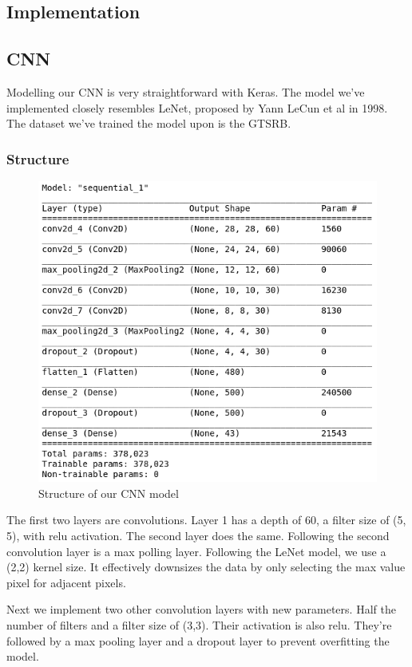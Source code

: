 \documentclass[12pt, landscape, margin=2cm]{article}
\begin{document}
\begin{multicols}{3}
\section{Implementation}

\subsection{CNN}
Modelling our CNN is very straightforward with Keras. The model we've
implemented closely resembles LeNet, proposed by Yann LeCun et al in 1998. The
dataset we've trained the model upon is the GTSRB.

\subsubsection{Structure}
\begin{figure}[H]
    \centerline{\includegraphics[scale = 0.5]{model.png}}
    \caption{Structure of our CNN model}
    \label{fig:figuremodel}
\end{figure}

The first two layers are convolutions. Layer 1 has a depth of 60, a filter size
of (5, 5), with relu activation. The second layer does the same. Following the
second convolution layer is a max polling layer. Following the LeNet model, we
use a (2,2) kernel size. It effectively downsizes the data by only selecting the
max value pixel for adjacent pixels.

Next we implement two other convolution layers with new parameters. Half the
number of filters and a filter size of (3,3). Their activation is also relu.
They're followed by a max pooling layer and a dropout layer to prevent
overfitting the model. 


\end{multicols}
\end{document}
